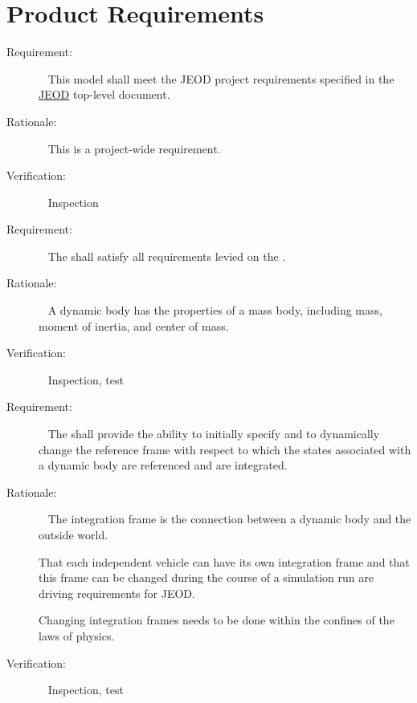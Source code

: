 
\chapter{Product Requirements}\label{ch:reqt}

\label{reqt:toplevel}
\begin{description}
\item[Requirement:]\ \newline
  This model shall meet the JEOD project requirements specified in the
  \hyperref{file:\JEODHOME/docs/JEOD.pdf}{part1}{reqt}{JEOD} top-level document.

\item[Rationale:]\ \newline
  This is a project-wide requirement.

\item[Verification:]\ \newline
  Inspection
\end{description}


\label{reqt:mass_requirements}
\begin{description}
\item[Requirement:]\ \newline
  The \ModelDesc shall satisfy all requirements levied on the
  .

\item[Rationale:]\ \newline
  A dynamic body has the properties of a mass body, including mass,
  moment of inertia, and center of mass.

\item[Verification:]\ \newline
  Inspection, test
\end{description}


\label{reqt:integ_frame}
\begin{description}
\item[Requirement:]\ \newline
  The \ModelDesc shall provide the ability to initially specify and to
  dynamically change the reference frame with respect to which the
  states associated with a dynamic body are referenced and are integrated.

\item[Rationale:]\ \newline
  The integration frame is the connection between a dynamic body and
  the outside world.

  That each independent vehicle can have its own integration frame and
  that this frame can be changed during the course of a simulation run
  are driving requirements for JEOD.

  Changing integration frames needs to be done within the confines of the
  laws of physics.

\item[Verification:]\ \newline
  Inspection, test
\end{description}



